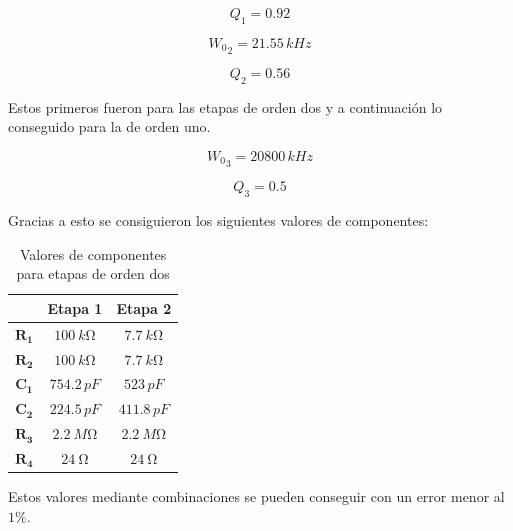 \begin{equation}
	Q_1 = 0.92
\end{equation}

\begin{equation}
	{W_0}_2 = 21.55 \, kHz
\end{equation}

\begin{equation}
	Q_2 = 0.56
\end{equation}

	Estos primeros fueron para las etapas de orden dos y a continuación lo conseguido para la de orden uno.

\begin{equation}
	{W_0}_3 = 20800 \, kHz
\end{equation}

\begin{equation}
	Q_3 = 0.5
\end{equation}

	Gracias a esto se consiguieron los siguientes valores de componentes:
\begin{table}[H]
\centering
\begin{tabular}{|c|c|c|}
\hline
            & \textbf{Etapa 1} & \textbf{Etapa 2} \\ \hline
$\mathbf{R_1}$ & $\SI{100}{k\ohm}$               & $\SI{7.7}{k\ohm}$             \\ \hline
$\mathbf{R_2}$ & $\SI{100}{k\ohm}$               & $\SI{7.7}{k\ohm}$             \\ \hline
$\mathbf{C_1}$ & $754.2 \, pF$             & $523 \, pF$              \\ \hline
$\mathbf{C_2}$ & $224.5 \, pF$           & $411.8 \, pF$             \\ \hline
$\mathbf{R_3}$ & $\SI{2.2}{M\ohm}$             & $\SI{2.2}{M\ohm}$             \\ \hline
$\mathbf{R_4}$ & $\SI{24}{\ohm}$             & $\SI{24}{\ohm}$             \\ \hline
\end{tabular}
\caption{Valores de componentes para etapas de orden dos}
\label{tabla:legendreetapasorden2}
\end{table}

	Estos valores mediante combinaciones se pueden conseguir con un error menor al $1 \%$.

